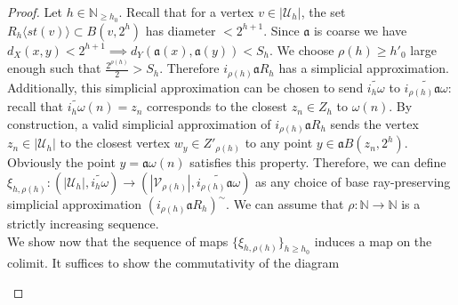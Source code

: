 \documentclass[a4paper,11pt]{article}
\theoremstyle{definition}
\theoremstyle{plain}
\theoremstyle{remark}
\begin{document}
{\begin{proof}
Let $h\in \mathbb{N}_{\geq h_0}$. Recall that for a vertex $v\in  |\mathcal{U}_{h}|$, the set $R_{h}\langle st(v) \rangle \subset B(v,2^h)$ has diameter $<2^{h+1}$. Since $\mathfrak{a}$ is coarse we have $d_{X}(x,y)<2^{h+1} \implies d_{Y}(\mathfrak{a}(x),\mathfrak{a}(y)) <S_{h}$. We choose $\rho(h)\geq h'_{0}$ large enough such that $\frac{2^{\rho(h)}}{2}> S_{h}$. Therefore  $i_{\rho(h)} \mathfrak{a} R_{h}$ has a simplicial approximation. Additionally, this simplicial approximation can be chosen to send $\widetilde{i_{h}\omega}$ to $\widetilde{i_{\rho(h)}\mathfrak{a} \omega}$: recall that $\widetilde{i_{h}\omega}(n) = z_{n}$ corresponds to the closest $z_{n}\in Z_{h}$ to $\omega(n)$. By construction, a valid simplicial approximation of $i_{\rho(h)} \mathfrak{a} R_{h}$ sends the vertex $z_n \in |\mathcal{U}_{h}|$ to the closest vertex $w_{y}\in Z'_{\rho(h)}$ to any point $y \in \mathfrak{a} B(z_{n},2^h)$. Obviously the point $y=\mathfrak{a}\omega(n)$ satisfies this property. Therefore, we can define $\xi_{h,\rho(h)}: (|\mathcal{U}_{h}|, \widetilde{i_{h}\omega})\rightarrow (|\mathcal{V}_{\rho(h)}|, \widetilde{i_{\rho(h)}\mathfrak{a}\omega})$ as any choice of base ray-preserving simplicial approximation $(i_{\rho(h)} \mathfrak{a} R_{h})^{\sim}$. We can assume that $\rho: \mathbb{N}\rightarrow \mathbb{N}$ is a strictly increasing sequence.\\

We show now that the sequence of maps $\{\xi_{h,\rho(h)}\}_{h\geq h_0}$ induces a map on the colimit. It suffices to show the commutativity of the diagram 


\begin{figure}[H]
\center
{}
\end{figure}


\end{proof}}
\end{document}
